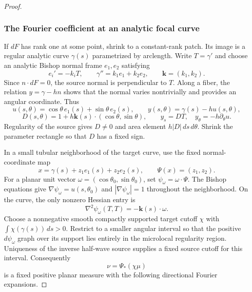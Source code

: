 \documentclass[11pt]{article}
\newcommand{\dd}{\,d}
\begin{document}
\begin{proof}
\subsubsection{The Fourier coefficient at an analytic focal curve}
If $dF$ has rank one at some point, shrink to a constant-rank patch. Its image is a regular analytic curve $\gamma(s)$ parametrized by arclength. Write $T=\gamma'$ and choose an analytic Bishop normal frame $e_1,e_2$ satisfying
\[
 e_i'=-k_iT,\qquad \gamma''=k_1e_1+k_2e_2,
 \qquad \mathbf k=(k_1,k_2).
\]
Since $n\cdot dF=0$, the source normal is perpendicular to $T$. Along a fiber, the relation $y=\gamma-hn$ shows that the normal varies nontrivially and provides an angular coordinate. Thus
\[
 u(s,\theta)=\cos\theta\,e_1(s)+\sin\theta\,e_2(s),\qquad
 y(s,\theta)=\gamma(s)-hu(s,\theta),
\]
\[
 D(s,\theta)=1+h\mathbf k(s)\cdot(\cos\theta,\sin\theta),
 \qquad y_s=DT,\quad y_\theta=-h\partial_\theta u.
\]
Regularity of the source gives $D\ne0$ and area element $h|D|\dd s\dd\theta$. Shrink the parameter rectangle so that $D$ has a fixed sign.

In a small tubular neighborhood of the target curve, use the fixed normal-coordinate map
\[
 x=\gamma(s)+z_1e_1(s)+z_2e_2(s),\qquad\Psi(x)=(z_1,z_2).
\]
For a planar unit vector $\omega=(\cos\theta_0,\sin\theta_0)$, set $\psi_\omega=\omega\cdot\Psi$. The Bishop equations give $\nabla\psi_\omega=u(s,\theta_0)$ and $|\nabla\psi_\omega|=1$ throughout the neighborhood. On the curve, the only nonzero Hessian entry is
\[
 \nabla^2\psi_\omega(T,T)=-\mathbf k(s)\cdot\omega.
\]
Choose a nonnegative smooth compactly supported target cutoff $\chi$ with $\int\chi(\gamma(s))\dd s>0$. Restrict to a smaller angular interval so that the positive $d\psi_\omega$ graph over its support lies entirely in the microlocal regularity region. Uniqueness of the inverse half-wave source supplies a fixed source cutoff for this interval. Consequently
\[
 \nu=\Psi_*(\chi\mu)
\]
is a fixed positive planar measure with the following directional Fourier expansions.


\end{proof}
\end{document}
